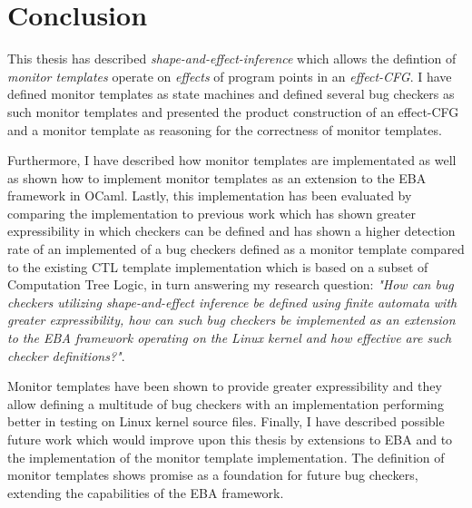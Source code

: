 \section{Conclusion}

This thesis has described \textit{shape-and-effect-inference} which allows the defintion of \textit{monitor templates} operate on \textit{effects} of program points in an \textit{effect-CFG}. I have defined monitor templates as state machines and defined several bug checkers as such monitor templates and presented the product construction of an effect-CFG and a monitor template as reasoning for the correctness of monitor templates. 

\newpar Furthermore, I have described how monitor templates are implementated as well as shown how to implement monitor templates as an extension to the EBA framework in OCaml. Lastly, this implementation has been evaluated by comparing the implementation to previous work which has shown greater expressibility in which checkers can be defined and has shown a higher detection rate of an implemented of a bug checkers defined as a monitor template compared to the existing CTL template implementation which is based on a subset of Computation Tree Logic, in turn answering my research question: \textit{"How can bug checkers utilizing shape-and-effect inference be defined using finite automata with greater expressibility, how can such bug checkers be implemented as an extension to the EBA framework operating on the Linux kernel and how effective are such checker definitions?"}.

\newpar Monitor templates have been shown to provide greater expressibility and they allow defining a multitude of bug checkers with an implementation performing better in testing on Linux kernel source files. Finally, I have described possible future work which would improve upon this thesis by extensions to EBA and to the implementation of the monitor template implementation. The definition of monitor templates shows promise as a foundation for future bug checkers, extending the capabilities of the EBA framework. 